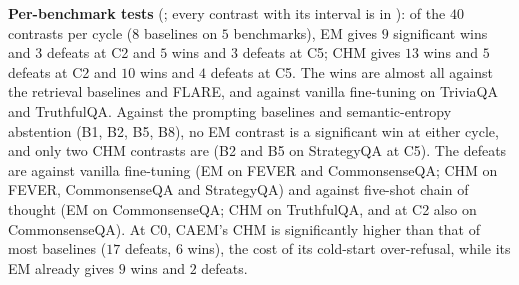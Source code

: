 \textbf{Per-benchmark tests} (; every contrast with its interval is in ): of the $40$ contrasts per cycle ($8$ baselines on $5$ benchmarks), EM gives $9$ significant wins and $3$ defeats at C2 and $5$ wins and $3$ defeats at C5; CHM gives $13$ wins and $5$ defeats at C2 and $10$ wins and $4$ defeats at C5. The wins are almost all against the retrieval baselines and FLARE, and against vanilla fine-tuning on TriviaQA and TruthfulQA. Against the prompting baselines and semantic-entropy abstention (B1, B2, B5, B8), no EM contrast is a significant win at either cycle, and only two CHM contrasts are (B2 and B5 on StrategyQA at C5). The defeats are against vanilla fine-tuning (EM on FEVER and CommonsenseQA; CHM on FEVER, CommonsenseQA and StrategyQA) and against five-shot chain of thought (EM on CommonsenseQA; CHM on TruthfulQA, and at C2 also on CommonsenseQA). At C0, CAEM's CHM is significantly higher than that of most baselines ($17$ defeats, $6$ wins), the cost of its cold-start over-refusal, while its EM already gives $9$ wins and $2$ defeats.








